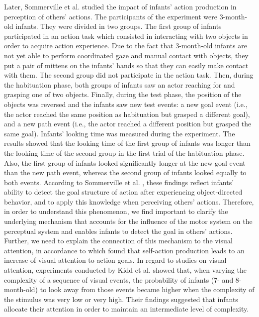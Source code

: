 \documentclass[conference]{IEEEtran}
\begin{document}
Later, Sommerville et al. \cite{sommerville2005action} studied the impact of infants' action production in perception of others' actions. The participants of the experiment were 3-month-old infants. They were divided in two groups. The first group of infants participated in an action task which consisted in interacting with two objects in order to acquire action experience. Due to the fact that 3-month-old infants are not yet able to perform coordinated gaze and manual contact with objects, they put a pair of mittens on the infants' hands so that they can easily make contact with them. The second group did not participate in the action task. Then, during the habituation phase, both groups of infants saw an actor reaching for and grasping one of two objects. Finally, during the test phase, the position of the objects was reversed and the infants saw new test events: a new goal event (i.e., the actor reached the same position as habituation but grasped a different goal), and a new path event (i.e., the actor reached a different position but grasped the same goal). Infants' looking time was measured during the experiment. The results showed that the looking time of the first group of infants was longer than the looking time of the second group in the first trial of the habituation phase. Also, the first group of infants looked significantly longer at the new goal event than the new path event, whereas the second group of infants looked equally to both events. According to Sommerville et al. \cite{sommerville2005action}, these findings reflect infants’ ability to detect the goal structure of action after experiencing object-directed behavior, and to apply this knowledge when perceiving others' actions. Therefore, in order to understand this phenomenon, we find important to clarify the underlying mechanism that accounts for the influence of the motor system on the perceptual system and enables infants to detect the goal in others' actions. Further, we need to explain the connection of this mechanism to the visual attention, in accordance to \cite{sommerville2005action} which found that self-action production leads to an increase of visual attention to action goals. In regard to studies on visual attention, experiments conducted by Kidd et al. \cite{kidd2012goldilocks} showed that, when varying the complexity of a sequence of visual events, the probability of infants (7- and 8-month-old) to look away from those events became higher when the complexity of the stimulus was very low or very high. Their findings suggested that infants allocate their attention in order to maintain an intermediate level of complexity.
\end{document}
